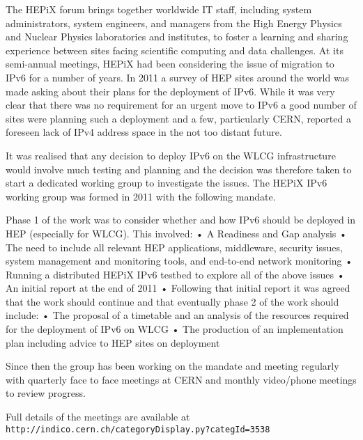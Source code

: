 The HEPiX forum brings together worldwide IT staff, including system administrators, system engineers, and managers from the High Energy Physics and Nuclear Physics laboratories and institutes, to foster a learning and sharing experience between sites facing scientific computing and data challenges. At its semi-annual meetings, HEPiX had been considering the issue of migration to IPv6 for a number of years. In 2011 a survey of HEP sites around the world was made asking about their plans for the deployment of IPv6. While it was very clear that there was no requirement for an urgent move to IPv6 a good number of sites were planning such a deployment and a few, particularly CERN, reported a foreseen lack of IPv4 address space in the not too distant future.

It was realised that any decision to deploy IPv6 on the WLCG infrastructure would involve much testing and planning and the decision was therefore taken to start a dedicated working group to investigate the issues. The HEPiX IPv6 working group was formed in 2011 with the following mandate.

Phase 1 of the work was to consider whether and how IPv6 should be deployed in HEP (especially for WLCG). This involved:
	•	A Readiness and Gap analysis
	•	The need to include all relevant HEP applications, middleware, security issues, system management and monitoring tools, and end-to-end network monitoring
	•	Running a distributed HEPiX IPv6 testbed to explore all of the above issues
	•	An initial report at the end of 2011
	•	
Following that initial report it was agreed that the work should continue and that eventually phase 2 of the work should include:
	•	The proposal of a timetable and an analysis of the resources required for the deployment of IPv6 on WLCG
	•	The production of an implementation plan including advice to HEP sites on deployment

Since then the group has been working on the mandate and meeting regularly with quarterly face to face meetings at CERN and monthly video/phone meetings to review progress. 

Full details of the meetings are available at {\tt http://indico.cern.ch/categoryDisplay.py?categId=3538}


